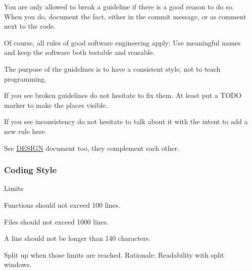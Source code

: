 You are only allowed to break a guideline if there is a good reason to do so. When you do, document the fact, either in the commit message, or as comment next to the code.

Of course, all rules of good software engineering apply\+: Use meaningful names and keep the software both testable and reusable.

The purpose of the guidelines is to have a consistent style, not to teach programming.

If you see broken guidelines do not hesitate to fix them. At least put a T\+O\+D\+O marker to make the places visible.

If you see inconsistency do not hesitate to talk about it with the intent to add a new rule here.

See \hyperlink{doc_DESIGN_md}{D\+E\+S\+I\+G\+N} document too, they complement each other.

\subsubsection*{Coding Style}


\begin{DoxyItemize}
\item Limits
\begin{DoxyItemize}
\item Functions should not exceed 100 lines.
\item Files should not exceed 1000 lines.
\item A line should not be longer than 140 characters.
\end{DoxyItemize}
\end{DoxyItemize}

Split up when those limits are reached. Rationale\+: Readability with split windows.


